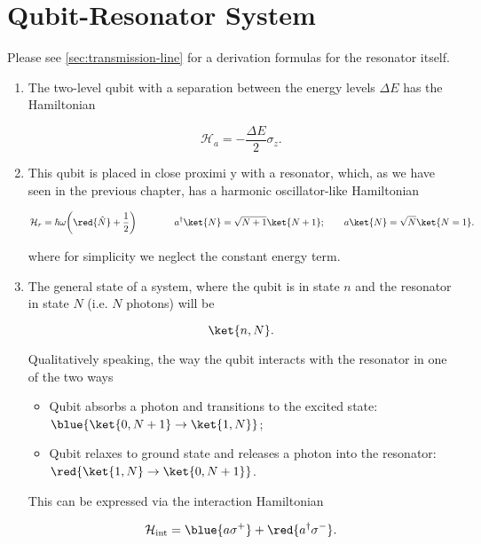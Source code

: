 
\section{Qubit-Resonator               System
  \cite{Blais_2004}}

\begin{framed}\noindent
  Please  see \autoref{sec:transmission-line}
  for a derivation formulas for the resonator
  itself.
\end{framed}

\begin{enumerate}
\item The  two-level qubit with  a separation
  between the energy  levels $ \Delta E  $ has the
  Hamiltonian

\begin{equation}
  \mathcal{H}_{a}= -\frac{\Delta E}{2}\sigma_z.
  \label{qrA}
\end{equation}

\item This qubit is placed in close proximi y
  with a resonator, which, as we have seen in
  the  previous   chapter,  has   a  harmonic
  oscillator-like Hamiltonian

\begin{equation}
  \mathcal{H}_{r}={\hbar\omega}\bigg(\red{\hat{N}}+\frac{1}{2}\bigg)\qquad \qquad a^{\dagger}\ket{N}=\sqrt{N+1}\ket{N+1}; \qquad a\ket{N}=\sqrt{N}\ket{N=1}.
  \label{qrR}
\end{equation}

\noindent where for simplicity we neglect the
constant energy term.

\item The  general state  of a  system, where
  the  qubit  is  in  state $  n  $  and  the
  resonator  in state  $  N $  (i.e.   $ N  $
  photons) will be

\begin{equation}
  \ket{n,N}.
\end{equation}

\noindent Qualitatively speaking, the way the
qubit interacts with the  resonator in one of
the two ways

\begin{itemize}
\item Qubit absorbs  a photon and transitions
  to        the         excited        state:
  $ \blue{\ket{0,N+1} \rightarrow \ket{1,N}} $;
\item  Qubit  relaxes  to  ground  state  and
  releases  a  photon   into  the  resonator:
  $ \red{\ket{1,N} \rightarrow \ket{0,N+1}} $.
\end{itemize}

This  can be  expressed  via the  interaction
Hamiltonian

\begin{equation}
  \mathcal{H}_{\text{int}}=\blue{a\sigma^+}+\red{a^{\dagger}\sigma^-}.
  \label{qrInt}
\end{equation}
\end{enumerate}
